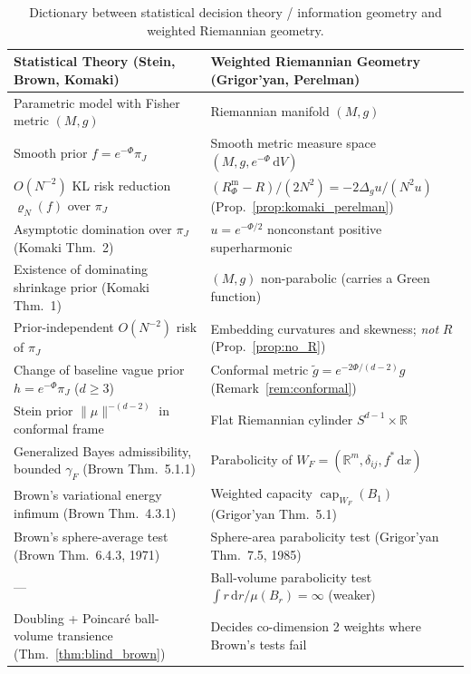 \documentclass[a4paper,11pt,noarxiv]{quantumarticle}
\newcommand{\R}{\mathbb{R}}
\newcommand{\Rm}{R^{\mathrm m}}
\newcommand{\norm}[1]{\lVert #1\rVert}
\newcommand{\dd}{\,\mathrm{d}}
\DeclareMathOperator{\capa}{cap}
\theoremstyle{plain}
\theoremstyle{definition}
\theoremstyle{remark}
\begin{document}
\begin{table}[t]
\caption{Dictionary between statistical decision theory / information
geometry and weighted Riemannian geometry.}
\label{tab:dict}
\small
\begin{tabular}{@{}>{\raggedright\arraybackslash}p{}>{\raggedright\arraybackslash}p{}@{}}
\toprule
Statistical Theory (Stein, Brown, Komaki) & Weighted Riemannian Geometry (Grigor'yan, Perelman) \\
\midrule
Parametric model with Fisher metric $(M,g)$ & Riemannian manifold $(M,g)$ \\
Smooth prior $f=e^{-\Phi}\pi_J$ & Smooth metric measure space $(M,g,e^{-\Phi}\dd V)$ \\
$O(N^{-2})$ KL risk reduction $\varrho_N(f)$ over $\pi_J$ & $(\Rm_\Phi-R)/(2N^2)=-2\Delta_g u/(N^2u)$ (Prop.~\ref{prop:komaki_perelman}) \\
Asymptotic domination over $\pi_J$ (Komaki Thm.\ 2) & $u=e^{-\Phi/2}$ nonconstant positive superharmonic \\
Existence of dominating shrinkage prior (Komaki Thm.\ 1) & $(M,g)$ non-parabolic (carries a Green function) \\
Prior-independent $O(N^{-2})$ risk of $\pi_J$ & Embedding curvatures and skewness; \emph{not} $R$ (Prop.~\ref{prop:no_R}) \\
Change of baseline vague prior $h=e^{-\Phi}\pi_J$ ($d\ge3$) & Conformal metric $\tilde g=e^{-2\Phi/(d-2)}g$ (Remark~\ref{rem:conformal}) \\
Stein prior $\norm{\mu}^{-(d-2)}$ in conformal frame & Flat Riemannian cylinder $S^{d-1}\times\R$ \\
Generalized Bayes admissibility, bounded $\gamma_F$ (Brown Thm.\ 5.1.1) & Parabolicity of $W_F=(\R^m,\delta_{ij},f^*\dd x)$ \\
Brown's variational energy infimum (Brown Thm.\ 4.3.1) & Weighted capacity $\capa_{W_F}(B_1)$ (Grigor'yan Thm.\ 5.1) \\
Brown's sphere-average test (Brown Thm.\ 6.4.3, 1971) & Sphere-area parabolicity test (Grigor'yan Thm.\ 7.5, 1985) \\
--- & Ball-volume parabolicity test $\int r\dd r/\mu(B_r)=\infty$ (weaker) \\
Doubling + Poincar\'e ball-volume transience (Thm.~\ref{thm:blind_brown}) & Decides co-dimension 2 weights where Brown's tests fail \\
\bottomrule
\end{tabular}
\end{table}
\end{document}
